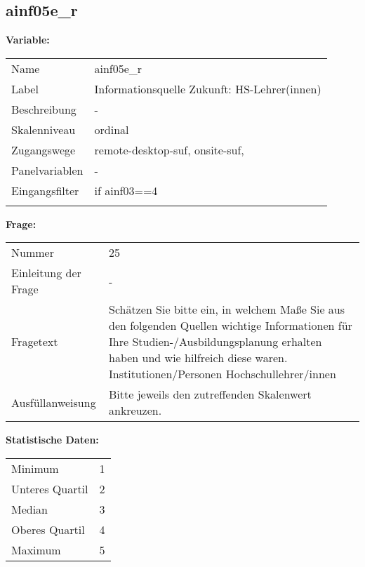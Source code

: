 	
	
	\subsection{ainf05e\_r}
	\label{subSection:ainf05e_r}

	\noindent\textbf{Variable:}\\
		\begin{tabular}{lL{11.3cm}}
			\label{tableVariable:ainf05e_r}
			Name & ainf05e\_r \\
			Label & Informationsquelle Zukunft: HS-Lehrer(innen) \\
			Beschreibung & - \\
			Skalenniveau & ordinal \\
			Zugangswege &
				remote-desktop-suf,
				onsite-suf,
 \\
			Panelvariablen & -
			 \\
			Eingangsfilter & if ainf03==4 \\
 \\
		\end{tabular}

		\vspace*{1 cm}
		\noindent\textbf{Frage:}\\
		\begin{tabular}{lL{11.3cm}}
			\label{tableQuestion:ainf05e_r}
			Nummer & 25 \\
			Einleitung der Frage & - \\
			Fragetext & Schätzen Sie bitte ein, in welchem Maße Sie aus den folgenden Quellen wichtige Informationen für Ihre Studien-/Ausbildungsplanung erhalten haben und wie hilfreich diese waren.
Institutionen/Personen
Hochschullehrer/innen \\
			Ausfüllanweisung & Bitte jeweils den zutreffenden Skalenwert ankreuzen. \\
		\end{tabular}


		\vspace*{1 cm}
		\noindent\textbf{Statistische Daten:}\\
			\begin{tabular}{ll}
				\label{tableStatistics:ainf05e_r}
					Minimum & 1 \\
					Unteres Quartil & 2 \\
					Median & 3 \\
					Oberes Quartil & 4 \\
					Maximum & 5 \\
			\end{tabular}



